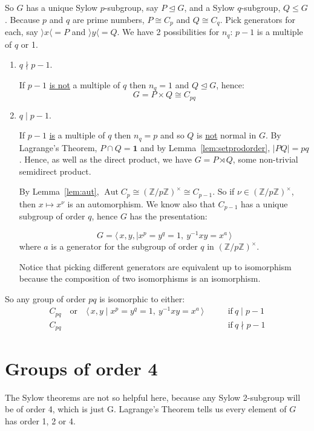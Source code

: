 \documentclass[a4paper, oneside, 12pt, final]{article}
\renewcommand{\emph}{\underline}
\theoremstyle{definition}
\DeclareMathOperator{\Aut}{Aut}
\newcommand{\nrmsgp}{\unlhd}
\newcommand{\Z}{\mathbb{Z}}
\newcommand{\Zn}[1]{\Z/#1\Z}
\newcommand{\units}[1]{(\Zn{#1})^\times}
\begin{document}
So \(G\) has a unique Sylow \(p\)-subgroup, say \(P \nrmsgp G\), and a Sylow \(q\)-subgroup, \(Q \leqslant G\).
Because \(p\) and \(q\) are prime numbers, \(P \cong C_p\) and \(Q \cong C_q\).
Pick generators for each, say \(\rangle x \langle  = P\) and \(\rangle y \langle = Q\).
We have 2 possibilities for \(n_q\): \(p-1\) is a multiple of \(q\) or 1.

\begin{enumerate}
    \item \(q \nmid p - 1\).

        If \(p-1\) \emph{is not} a multiple of \(q\) then \(n_q = 1\) and \(Q \nrmsgp G\), hence:
        \[G = P \times Q \cong C_{pq}\]

    \item \( q \mid p - 1\).

        If \(p-1\) \emph{is} a multiple of \(q\) then \(n_q = p\) and so \(Q\) is \emph{not} normal in \(G\).
        By Lagrange's Theorem, \(P \cap Q = \bm{1}\) and by Lemma~\ref{lem:setprodorder}, \(|PQ| = pq\).
        Hence, as well as the direct product, we have \(G = P \rtimes Q\), some non-trivial semidirect product.

        By Lemma~\ref{lem:aut}, \(\Aut{C_p} \cong \units{p} \cong C_{p-1}\).
        So if \(\nu \in \units{p}\), then \(x \mapsto x^\nu\) is an automorphism.
        We know also that \(C_{p-1}\) has a unique subgroup of order \(q\),
        hence \(G\) has the presentation:

        \[G = \langle \, x, y, \mid x^p = y^q = 1,\ y^{-1}xy = x^a \, \rangle\]
        where \(a\) is a generator for the subgroup of order \(q\) in
        \(\units{p}\).

        Notice that picking different generators are equivalent up to isomorphism because the composition of two
        isomorphisms is an isomorphism.
\end{enumerate}

So any group of order \(pq\) is isomorphic to either:
\begin{equation*}
\begin{aligned}
    C_{pq} \quad \text{or} \quad \langle \, x, y \mid x^p = y^q = 1,\ y^{-1}xy
    = x^a \, \rangle \qquad &\text{if} \ q \mid p-1 \\
    C_{pq} \qquad &\text{if} \ q \nmid p-1
\end{aligned}
\end{equation*}


\section{Groups of order 4}
The Sylow theorems are not so helpful here, because any Sylow 2-subgroup will be of order 4, which
is just G.
Lagrange's Theorem tells us every element of \(G\) has order 1, 2 or 4.
\end{document}
